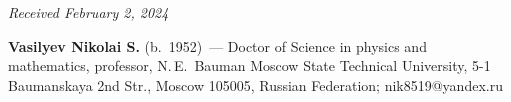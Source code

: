 \begin{multicols}{2}
{{\begin{thebibliography}{99}
\end{thebibliography}

 }
 }

\end{multicols}

\vspace*{-8pt}

\hfill{\small\textit{Received February 2, 2024}} 

\vspace*{-18pt}


\Contrl

\vspace*{-3pt}

\noindent
\textbf{Vasilyev Nikolai S.} (b.\ 1952)~--- Doctor of Science in physics and mathematics, professor, 
N.\,E.~Bauman Moscow State Technical University, 5-1 Baumanskaya 2nd Str., Moscow 105005, Russian 
Federation; \mbox{nik8519@yandex.ru}





\label{end\stat}

\renewcommand{\bibname}{\protect\rm Литература} 